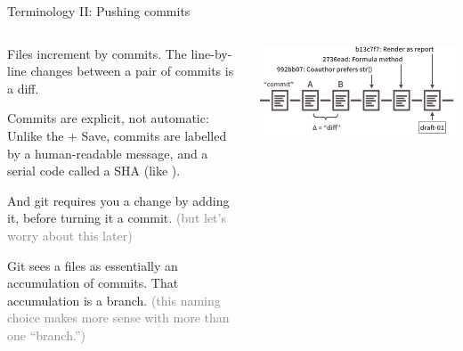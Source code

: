 \documentclass[ignorenonframetext, 10pt, aspectratio=169]{beamer}
\begin{document}
\begin{frame}{Terminology II: Pushing commits}
\begin{columns}[T]
\begin{column}{0.55\textwidth}
\begin{wideitemize}
\item<1-> Files increment by \alert{commit}s. The line-by-line changes between a pair of commits is a \alert{diff}.
\item<2-> Commits are explicit, not automatic: Unlike the  +  Save, commits are labelled by a human-readable \alert{message}, and a serial code called a \alert{SHA} (like ).
\item<2->And git requires you  a change by \alert{add}ing it, before turning it a commit. \textcolor{gray}{(but let's worry about this later)}
\item<3-> Git sees a files as essentially an accumulation of commits. That accumulation is a \alert{branch}. \textcolor{gray}{(this naming choice makes more sense with more than one ``branch.'')}
\end{wideitemize}
\end{column}
\begin{column}{0.45\textwidth}
\includegraphics[width = \linewidth]{commit-diff-sha-tag.png}
\end{column}
\end{columns}
\end{frame}
\end{document}
